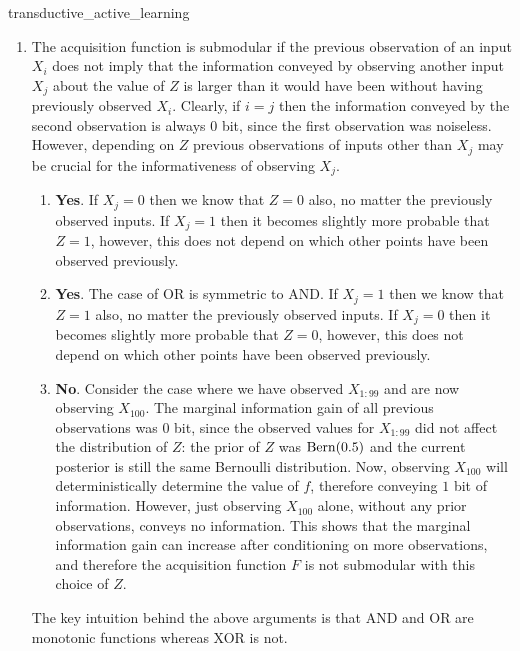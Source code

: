 \begin{solution}{transductive_active_learning}
\begin{enumerate}[beginpenalty=10000]
    \item The acquisition function is submodular if the previous observation of an input \(X_i\) does not imply that the information conveyed by observing another input \(X_j\) about the value of \(Z\) is larger than it would have been without having previously observed \(X_i\).
    Clearly, if \(i = j\) then the information conveyed by the second observation is always $0$ bit, since the first observation was noiseless.
    However, depending on \(Z\) previous observations of inputs other than \(X_j\) may be crucial for the informativeness of observing \(X_j\).
    \begin{enumerate}
        \item \textbf{Yes}. If \(X_j = 0\) then we know that \(Z = 0\) also, no matter the previously observed inputs. If \(X_j = 1\) then it becomes slightly more probable that \(Z = 1\), however, this does not depend on which other points have been observed previously.
        \item \textbf{Yes}. The case of OR is symmetric to AND. If \(X_j = 1\) then we know that \(Z = 1\) also, no matter the previously observed inputs. If \(X_j = 0\) then it becomes slightly more probable that \(Z = 0\), however, this does not depend on which other points have been observed previously.
        \item \textbf{No}. Consider the case where we have observed \(X_{1:99}\) and are now observing \(X_{100}\). The marginal information gain of all previous observations was $0$ bit, since the observed values for \(X_{1:99}\) did not affect the distribution of \(Z\): the prior of \(Z\) was \(\Bern{0.5}\) and the current posterior is still the same Bernoulli distribution.
        Now, observing \(X_{100}\) will deterministically determine the value of \(f\), therefore conveying $1$ bit of information.
        However, just observing \(X_{100}\) alone, without any prior observations, conveys no information.
        This shows that the marginal information gain can increase after conditioning on more observations, and therefore the acquisition function \(F\) is not submodular with this choice of \(Z\).
    \end{enumerate}\vspace{1ex}
    The key intuition behind the above arguments is that AND and OR are monotonic functions whereas XOR is not.
  \end{enumerate}
\end{solution}

\section*{}

